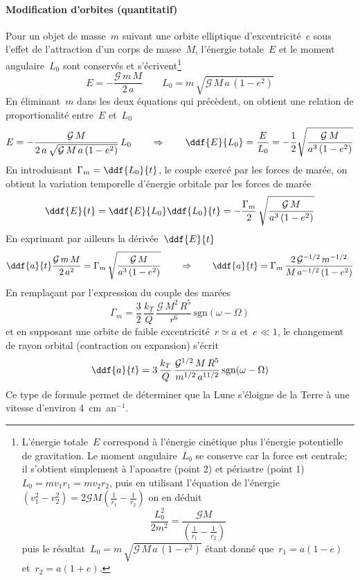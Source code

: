 

\sk
\paragraph{Modification d'orbites (quantitatif)} Pour un objet de masse~$m$ suivant une orbite elliptique d'excentricité~$e$ sous l'effet de l'attraction d'un corps de masse~$M$, l'énergie totale~$E$ et le moment angulaire~$L_0$ sont conservés et s'écrivent\footnote{L'énergie totale~$E$ correspond à l'énergie cinétique
plus l'énergie potentielle de gravitation.
Le moment angulaire~$L_0$ se conserve car la force est centrale; 
il s'obtient simplement à l'apoastre (point 2) et périastre (point 1)
$L_0 = m v_1 r_1 = m v_2 r_2$, puis en utilisant
l'équation de l'énergie~$\left( v_1^2 - v_2^2 \right) = 2 \mathcal{G} M \left( \frac{1}{r_1} - \frac{1}{r_2} \right)$
on en déduit
\[ \frac{L_0^2}{2 m^2} = \frac{\mathcal{G}M}{(\frac{1}{r_1}-\frac{1}{r_2})} \]
puis le résultat~$L_0 = m \, \sqrt{\mathcal{G}\,M\,a\,(1-e^2)}$
étant donné que~$r_1 = a (1-e)$ et~$r_2 = a (1+e)$.}
\[  E = - \frac{\mathcal{G}\,m\,M}{2\,a} \qquad L_0 = m \, \sqrt{\mathcal{G}\,M\,a\,(1-e^2)} \] 
En éliminant~$m$ dans les deux équations qui précèdent, on obtient une relation de proportionalité entre~$E$ et~$L_0$
\[ E = - \frac{\mathcal{G}\,M}{2\,a\,\sqrt{\mathcal{G} \, M \, a \, (1-e^2)}} \,L_0 \qquad \Rightarrow \qquad \ddf{E}{L_0} = \frac{E}{L_0} = - \frac{1}{2} \sqrt{ \frac{\mathcal{G}\,M}{a^3 \, (1-e^2)} } \]
En introduisant~$\Gamma_m = \ddf{L_0}{t}$, le couple exercé par les forces de marée, on obtient la variation temporelle d'énergie orbitale par les forces de marée
\[ \ddf{E}{t} = \ddf{E}{L_0} \ddf{L_0}{t} = - \frac{\Gamma_m}{2} \, \sqrt{ \frac{\mathcal{G}\,M}{a^3 \, (1-e^2) } } \]
\noindent En exprimant par ailleurs la dérivée~$\ddf{E}{t}$
\[
\ddf{a}{t} \frac{\mathcal{G}\,m\,M}{2\,a^2} = \Gamma_m \, \sqrt{ \frac{\mathcal{G}\,M}{a^3 \, (1-e^2) } }
\qquad \Rightarrow \qquad
\ddf{a}{t} = \Gamma_m \, \frac{2\,\mathcal{G}^{-1/2}\,m^{-1/2}}{M \, a^{-1/2} \, (1-e^2) }
\]
\noindent En remplaçant par l'expression du couple des marées 
\[ \Gamma_m = \frac{3}{2} \, \frac{k_T}{Q} \, \frac{\mathcal{G}\,M^2\,R^5}{r^6} \, \textrm{sgn}(\omega-\Omega) \]
et en supposant une orbite de faible excentricité~$r \simeq a$ et~$e \ll 1$, le changement de rayon orbital (contraction ou expansion) s'écrit
\[
\ddf{a}{t} = 3 \, \frac{k_T}{Q} \, \frac{\mathcal{G}^{1/2}\,M\,R^5}{m^{1/2} \, a^{11/2} } \, \textrm{sgn}(\omega-\Omega)
\]
Ce type de formule permet de déterminer que la Lune s'éloigne de la Terre à une vitesse d'environ 4~cm~an$^{-1}$.

